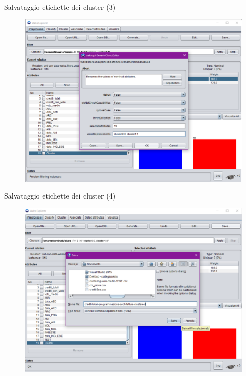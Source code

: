 \documentclass{beamer}
\begin{document}
\begin{frame}{Salvataggio etichette dei cluster (3)}
  \begin{figure}[bt]
    \begin{center}
    \includegraphics[width = 1\textwidth]{../img/save-cluster-ass-3.pdf}
    \end{center}
  \end{figure}
\end{frame}

\begin{frame}{Salvataggio etichette dei cluster (4)}
  \begin{figure}[bt]
    \begin{center}
    \includegraphics[width = 1\textwidth]{../img/save-cluster-ass-4.pdf}
    \end{center}
  \end{figure}
\end{frame}
\end{document}
